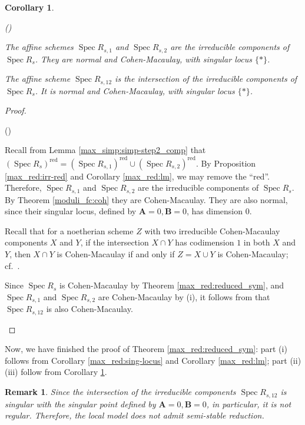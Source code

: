 \documentclass[pdflatex,sn-mathphys-num]{sn-jnl}%
\theoremstyle{thmstyleone}%
\newtheorem{corollary}[subsubsection]{Corollary}%
\theoremstyle{thmstyletwo}%
\newtheorem{remark}[subsubsection]{Remark}%
\numberwithin{equation}{subsection}
\theoremstyle{thmstylethree}%
\newcommand{\bA}{\ensuremath{\mathbf{A}}\xspace}
\newcommand{\bB}{\ensuremath{\mathbf{B}}\xspace}
\newcommand{\red}{\ensuremath{\mathrm{red}}\xspace}
\DeclareMathOperator{\Spec}{Spec}
\newenvironment{altenumerate}
	{\begin{list}
			{(\theenumi) }
			{\usecounter{enumi}
				\setlength{\labelwidth}{0pt}
				\setlength{\labelsep}{0pt}
				\setlength{\leftmargin}{0pt}
				\setlength{\itemsep}{\the\smallskipamount}
				\renewcommand{\theenumi}{\roman{enumi}}
		}}
		{\end{list}}
\begin{document}
\begin{corollary}\label{max_red:irr-comp}
\begin{altenumerate}
    \item The affine schemes $\Spec R_{s,1}$ and $\Spec R_{s,2}$ are the irreducible components of $\Spec R_{s}$. They are normal and Cohen-Macaulay, with singular locus $\{*\}$.
    \item The affine scheme $\Spec R_{s,12}$ is the intersection of the irreducible components of $\Spec R_{s}$. It is normal and Cohen-Macaulay, with singular locus $\{*\}$.
\end{altenumerate}
\end{corollary}
\begin{proof}
\begin{altenumerate}
\item Recall from Lemma \ref{max_simp:simp-step2_comp} that $(\Spec R_{s})^\red=(\Spec R_{s,1})^\red\cup (\Spec R_{s,2})^\red$. 
By Proposition \ref{max_red:irr-red} and Corollary \ref{max_red:lm}, we may remove the ``red''. Therefore, $\Spec R_{s,1}$ and $\Spec R_{s,2}$ are the irreducible components of $\Spec R_s$. By Theorem \ref{moduli_fc:coh} they are Cohen-Macaulay. They are also normal, since their singular locus, defined by $\bA=0,\bB=0$, has dimension $0$.

\item Recall that for a noetherian scheme $Z$ with two irreducible Cohen-Macaulay components $X$ and $Y$, if the intersection $X\cap Y$ has codimension $1$ in both $X$ and $Y$, then $X\cap Y$ is Cohen-Macaulay if and only if $Z=X\cup Y$ is Cohen-Macaulay; cf.\ \cite[Lemma 4.22]{Gortz2001}.

Since $\Spec R_{s}$ is Cohen-Macaulay by Theorem \ref{max_red:reduced_sym}, and $\Spec R_{s,1}$ and $\Spec R_{s,2}$ are Cohen-Macaulay by (i), it follows from \cite[Lemma 4.22]{Gortz2001} that $\Spec R_{s,12}$ is also Cohen-Macaulay.
\end{altenumerate}
\end{proof}

Now, we have finished the proof of Theorem \ref{max_red:reduced_sym}: 
part (i) follows from Corollary \ref{max_red:sing-locus} and Corollary \ref{max_red:lm};
part (ii)(iii) follow from Corollary \ref{max_red:irr-comp}.



\begin{remark}\label{max_red:intersection}
Since the intersection of the irreducible components $\Spec R_{s,12}$ is singular with the singular point defined by $\bA=0,\bB=0$, in particular, it is not regular.
Therefore, the local model does not admit semi-stable reduction.
\end{remark}
\end{document}
